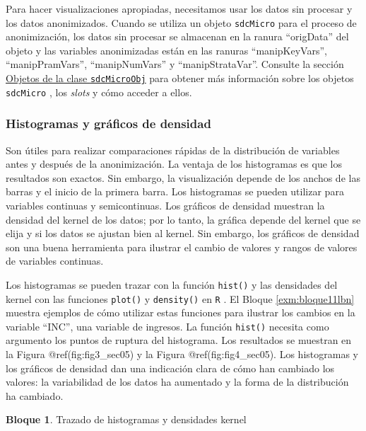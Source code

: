 \documentclass[]{book}
\theoremstyle{definition}
\theoremstyle{definition}
\newtheorem{example}{Bloque}[chapter]
\theoremstyle{definition}
\theoremstyle{definition}
\theoremstyle{remark}
\begin{document}
Para hacer visualizaciones apropiadas, necesitamos usar los datos sin procesar y los datos anonimizados. Cuando se utiliza un objeto \texttt{sdcMicro} para el proceso de anonimización, los datos sin procesar se almacenan en la ranura ``origData'' del objeto y las variables anonimizadas están en las ranuras ``manipKeyVars'', ``manipPramVars'', ``manipNumVars'' y ``manipStrataVar''. Consulte la sección \protect\hyperlink{objetos-de-la-clase-sdcmicroobj}{Objetos de la clase \texttt{sdcMicroObj}} para obtener más información sobre los objetos \texttt{sdcMicro} , los \emph{slots} y cómo acceder a ellos.

\hypertarget{histogramas-y-gruxe1ficos-de-densidad}{%
\subsubsection{Histogramas y gráficos de densidad}\label{histogramas-y-gruxe1ficos-de-densidad}}

Son útiles para realizar comparaciones rápidas de la distribución de variables antes y después de la anonimización. La ventaja de los histogramas es que los resultados son exactos. Sin embargo, la
visualización depende de los anchos de las barras y el inicio de la primera barra. Los histogramas se pueden utilizar para variables continuas y semicontinuas. Los gráficos de densidad muestran la densidad del kernel de los datos; por lo tanto, la gráfica depende del kernel que se elija y si los datos se ajustan bien al kernel. Sin embargo, los gráficos de densidad son una buena herramienta para ilustrar el cambio de valores y rangos de valores de variables continuas.

Los histogramas se pueden trazar con la función \texttt{hist()} y las densidades del kernel con las funciones \texttt{plot()} y \texttt{density()} en \texttt{R} . El Bloque \ref{exm:bloque11lbn} muestra ejemplos de cómo utilizar estas funciones para ilustrar los cambios en la variable ``INC'', una variable de ingresos. La función \texttt{hist()} necesita como argumento los puntos de ruptura del histograma. Los resultados se muestran en la Figura @ref(fig:fig3\_sec05) y la Figura @ref(fig:fig4\_sec05). Los histogramas y los gráficos de densidad dan una indicación clara de cómo han cambiado los valores: la variabilidad de los datos ha aumentado y la forma de la distribución ha cambiado.

\begin{example}
\protect\hypertarget{exm:bloque11lbn}{}{\label{exm:bloque11lbn} }Trazado de histogramas y densidades kernel
\end{example}
\end{document}
